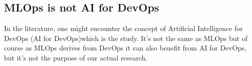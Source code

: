 \subsection{MLOps is not AI for DevOps}\label{subsec:mlops-is-not-ai-for-devops}
In the literature, one might encounter the concept of Artificial Intelligence for DevOps (AI for DevOps)which is the study.
It's not the same as MLOps but of course as MLOps derives from DevOps it can also benefit from AI for DevOps,
but it's not the purpose of our actual research.